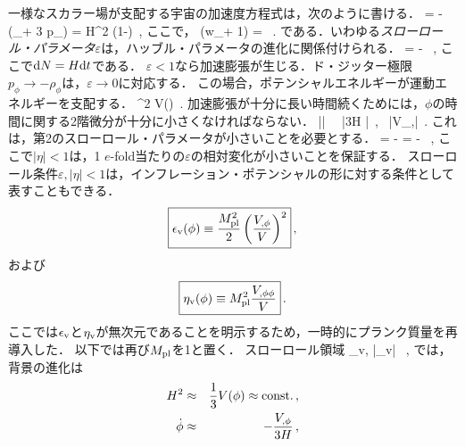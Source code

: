 一様なスカラー場が支配する宇宙の加速度方程式は，次のように書ける．
\beq
{} = -  (\rho_\phi + 3 p_\phi) = H^2 (1-\varepsilon)\, ,
\eeq
ここで，
\beq
\varepsilon \equiv {} (w_\phi + 1) =  \, .
\eeq
である．いわゆる{\it スローロール・パラメータ}$\varepsilon$は，ハッブル・パラメータの進化に関係付けられる．
\beq
{} = - \, ,
\eeq
ここで${\rm d} N = H {\rm d} t$である．
$\varepsilon < 1$なら加速膨張が生じる．ド・ジッター極限$p_\phi \to - \rho_\phi$は，$\varepsilon \to 0$に対応する．
この場合，ポテンシャルエネルギーが運動エネルギーを支配する．
\beq
\dot \phi^2 \ll V(\phi)\, .
\eeq
加速膨張が十分に長い時間続くためには，$\phi$の時間に関する2階微分が十分に小さくなければならない．
\beq
|\ddot{\phi}| \ \ll \ |3H \dot{\phi}|\, , \, |V_{,\phi}|\, .
\eeq
これは，第2のスローロール・パラメータが小さいことを必要とする．
\beq
\eta = -  = \varepsilon -  \, ,
\eeq
ここで$|\eta| < 1$は，1 $e$-fold当たりの$\varepsilon$の相対変化が小さいことを保証する．
スローロール条件$\varepsilon, |\eta| < 1$は，インフレーション・ポテンシャルの形に対する条件として表すこともできる．
\begin{equation}
\fbox{$\displaystyle \epsilon_{\rm v}(\phi) \equiv \frac{M_{\rm pl}^2}{2} \left(\frac{V_{,\phi}}{V}\right)^2 $}\, ,
\end{equation}
および
\begin{equation}
\fbox{$\displaystyle
\eta_{\rm v}(\phi) \equiv M_{\rm pl}^2 \frac{V_{,\phi\phi}}{V} $}\, .
\end{equation}
ここでは$\epsilon_{\rm v}$と$\eta_{\rm v}$が無次元であることを明示するため，一時的にプランク質量を再導入した．
以下では再び$M_{\rm pl}$を1と置く．
スローロール領域
\beq
\label{equ:SR}
\epsilon_{\rm v}, |\eta_{\rm v}| \, ,
\eeq
では，背景の進化は
\begin{eqnarray}
H^2 &\approx& {1\over 3} V(\phi) \approx \text{const.}\, , \label{equ:SRH}\\
\dot{\phi} &\approx& -\frac{V_{,\phi}}{3H} \label{equ:SRphi}\, ,
\end{eqnarray}
